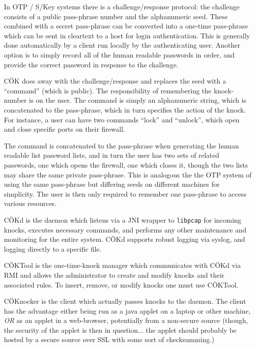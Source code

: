 \documentclass[landscape,twocolumn,headrule]{foils}
\begin{document}

In OTP / S/Key systems there is a challenge/response protocol:  the challenge consists of a public pass-phrase number and the alphanumeric seed.  These combined with a secret pass-phrase can be converted into a one-time pass-phrase which can be sent in cleartext to a host for login authentication.  This is generally done automatically by a client run locally by the authenticating user.  Another option is to simply record all of the human readable passwords in order, and provide the correct password in response to the challenge.


C\"{O}K does away with the challenge/response and replaces the seed with a ``command'' (which is public).  The responsibility of remembering the knock-number is on the user.  The command is simply an alphanumeric string, which is concatenated to the pass-phrase, which in turn specifies the action of the knock.  For instance, a user can have two commands ``lock'' and ``unlock'', which open and close specific ports on their firewall.

The command is concatenated to the pass-phrase when generating the human readable list password lists, and in turn the user has two sets of related passwords, one which opens the firewall, one which closes it, though the two lists may share the same private pass-phrase.  This is analogous the the OTP system of using the same pass-phrase but differing seeds on different machines for simplicity.  The user is then only required to remember one pass-phrase to access various resources.


C\"{O}Kd is the daemon which listens via a JNI wrapper to \texttt{libpcap} for incoming knocks, executes necessary commands, and performs any other maintenance and monitoring for the entire system.  C\"{O}Kd supports robust logging via syslog, and logging directly to a specific file.

C\"{O}KTool is the one-time-knock manager which communicates with C\"{O}Kd via RMI and allows the administrator to create and modify knocks and their associated rules.  To insert, remove, or modify knocks one must use C\"{O}KTool.


C\"{O}Knocker is the client which actually passes knocks to the daemon.  The client has the advantage either being run as a java applet on a laptop or other machine, \emph{OR} as an applet in a web-browser, potentially from a non-secure source (though, the security of the applet is then in question...  the applet should probably be hosted by a secure source over SSL with some sort of checksumming.)
\end{document}
